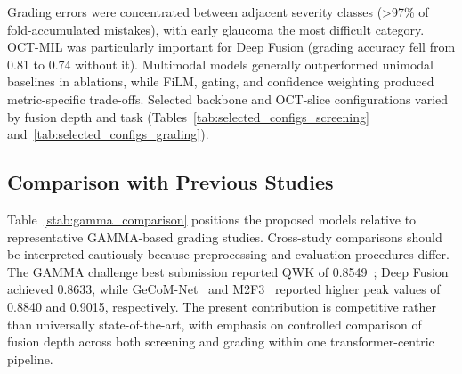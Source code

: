 \documentclass[sn-mathphys]{sn-jnl}%
\theoremstyle{thmstyleone}%
\theoremstyle{thmstyletwo}%
\theoremstyle{thmstylethree}%
\begin{document}
Grading errors were concentrated between adjacent severity classes (>97\% of fold-accumulated mistakes), with early glaucoma the most difficult category. OCT-MIL was particularly important for Deep Fusion (grading accuracy fell from 0.81 to 0.74 without it). Multimodal models generally outperformed unimodal baselines in ablations, while FiLM, gating, and confidence weighting produced metric-specific trade-offs. Selected backbone and OCT-slice configurations varied by fusion depth and task (Tables~\ref{tab:selected_configs_screening} and~\ref{tab:selected_configs_grading}).

\subsection{Comparison with Previous Studies}
\label{subsec:comparison_prior_work}

Table~\ref{stab:gamma_comparison} positions the proposed models relative to representative GAMMA-based grading studies. Cross-study comparisons should be interpreted cautiously because preprocessing and evaluation procedures differ. The GAMMA challenge best submission reported QWK of 0.8549~\cite{wu2023gamma}; Deep Fusion achieved 0.8633, while GeCoM-Net~\cite{wang2024geometric} and M2F3~\cite{zhao2025enhancing} reported higher peak values of 0.8840 and 0.9015, respectively. The present contribution is competitive rather than universally state-of-the-art, with emphasis on controlled comparison of fusion depth across both screening and grading within one transformer-centric pipeline.
\end{document}
